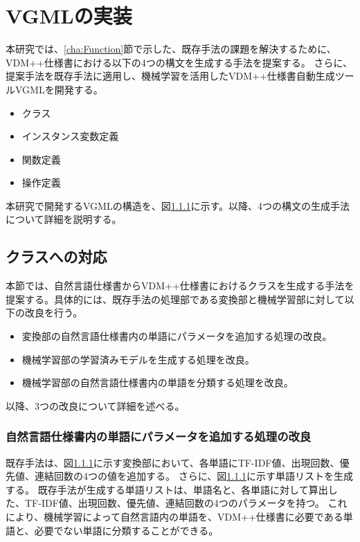 \chapter{VGMLの実装}\label{cha:Implementation}

本研究では、\ref{cha:Function}節で示した、既存手法の課題を解決するために、VDM++仕様書における以下の4つの構文を生成する手法を提案する。
さらに、提案手法を既存手法に適用し、機械学習を活用したVDM++仕様書自動生成ツールVGMLを開発する。

\begin{itemize}
    \item クラス
    \item インスタンス変数定義
    \item 関数定義
    \item 操作定義
\end{itemize}

本研究で開発するVGMLの構造を、図\ref{}に示す。以降、4つの構文の生成手法について詳細を説明する。

\section{クラスへの対応}
本節では、自然言語仕様書からVDM++仕様書におけるクラスを生成する手法を提案する。具体的には、既存手法の処理部である変換部と機械学習部に対して以下の改良を行う。

\begin{itemize}
    \item 変換部の自然言語仕様書内の単語にパラメータを追加する処理の改良。
    \item 機械学習部の学習済みモデルを生成する処理を改良。
    \item 機械学習部の自然言語仕様書内の単語を分類する処理を改良。
\end{itemize}

以降、3つの改良について詳細を述べる。

\subsection{自然言語仕様書内の単語にパラメータを追加する処理の改良}
既存手法は、図\ref{}に示す変換部において、各単語にTF-IDF値、出現回数、優先値、連結回数の4つの値を追加する。
さらに、図\ref{}に示す単語リストを生成する。
既存手法が生成する単語リストは、単語名と、各単語に対して算出した、TF-IDF値、出現回数、優先値、連結回数の4つのパラメータを持つ。
これにより、機械学習によって自然言語内の単語を、VDM++仕様書に必要である単語と、必要でない単語に分類することができる。

